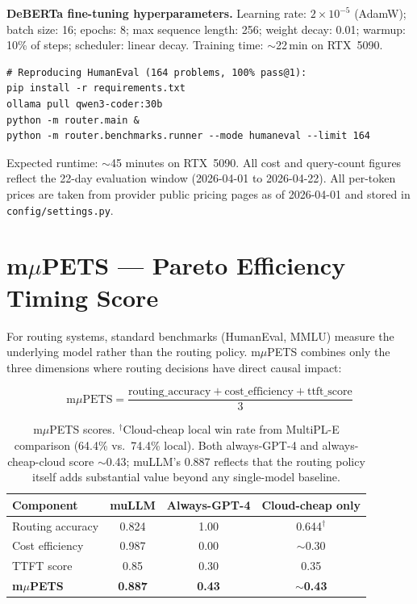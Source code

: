 \documentclass[11pt]{article}
\begin{document}
\textbf{DeBERTa fine-tuning hyperparameters.}
Learning rate: $2 \times 10^{-5}$ (AdamW); batch size: 16; epochs: 8;
max sequence length: 256; weight decay: 0.01; warmup: 10\% of steps;
scheduler: linear decay. Training time: $\sim$22\,min on RTX~5090.

\begin{lstlisting}
# Reproducing HumanEval (164 problems, 100% pass@1):
pip install -r requirements.txt
ollama pull qwen3-coder:30b
python -m router.main &
python -m router.benchmarks.runner --mode humaneval --limit 164
\end{lstlisting}

Expected runtime: $\sim$45 minutes on RTX~5090. All cost and
query-count figures reflect the 22-day evaluation window
(2026-04-01 to 2026-04-22). All per-token prices are taken from
provider public pricing pages as of 2026-04-01 and stored in
\texttt{config/settings.py}.

\section{m$\mu$PETS --- Pareto Efficiency Timing Score}

For routing systems, standard benchmarks (HumanEval, MMLU) measure the
underlying model rather than the routing policy. m$\mu$PETS combines
only the three dimensions where routing decisions have direct causal
impact:

\[
\text{m}\mu\text{PETS} = \frac{\text{routing\_accuracy} + \text{cost\_efficiency} + \text{ttft\_score}}{3}
\]

\begin{table}[h]
\centering
\small
\begin{tabular}{lccc}
\toprule
\textbf{Component} & \textbf{muLLM} & \textbf{Always-GPT-4} & \textbf{Cloud-cheap only} \\
\midrule
Routing accuracy & 0.824 & 1.00 & 0.644$^\dagger$ \\
Cost efficiency & 0.987 & 0.00 & $\sim$0.30 \\
TTFT score & 0.85 & 0.30 & 0.35 \\
\midrule
\textbf{m$\mu$PETS} & \textbf{0.887} & \textbf{0.43} & \textbf{$\sim$0.43} \\
\bottomrule
\end{tabular}
\caption{m$\mu$PETS scores. $^\dagger$Cloud-cheap local win rate from
MultiPL-E comparison (64.4\% vs.\ 74.4\% local). Both always-GPT-4 and
always-cheap-cloud score $\sim$0.43; muLLM's 0.887 reflects that the
routing policy itself adds substantial value beyond any single-model
baseline.}
\label{tab:mpets}
\end{table}
\end{document}
